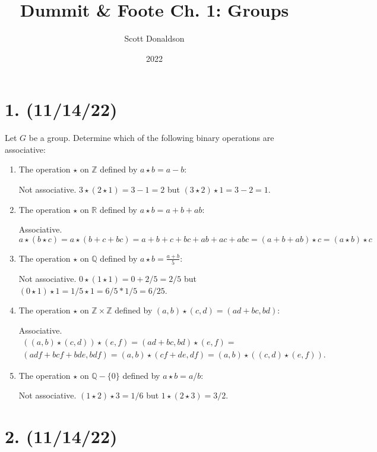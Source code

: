 \documentclass{article}
\title{Dummit \& Foote Ch. 1: Groups}
\author{Scott Donaldson}
\date{2022}
\begin{document}
\maketitle

\section*{1. (11/14/22)}

Let $G$ be a group. Determine which of the following binary operations are associative:

\begin{enumerate}[label=\alph*)]
    \item The operation $\star$ on $\mathbb{Z}$ defined by $a \star b = a - b:$
    
          Not associative. $3 \star (2 \star 1) = 3 - 1 = 2$ but $(3 \star 2) \star 1 = 3 - 2 = 1$.
    \item The operation $\star$ on $\mathbb{R}$ defined by $a \star b = a + b + ab:$
    
          Associative. 
          \begin{equation*}
            a \star (b \star c) = a \star (b + c + bc) = a + b + c + bc + ab + ac + abc =
            (a + b + ab) \star c = (a \star b) \star c
          \end{equation*}
    \item The operation $\star$ on $\mathbb{Q}$ defined by $a \star b = \frac{a + b}{5}$:
    
          Not associative. $0 \star (1 \star 1) = 0 + 2/5 = 2/5$ but $(0 \star 1) \star 1 = 1/5 \star 1 = 6/5 * 1/5 = 6/25$.
    \item The operation $\star$ on $\mathbb{Z} \times \mathbb{Z}$ defined by $(a, b) \star (c, d) = (ad + bc, bd):$
    
          Associative.
          \begin{multline*}
            ((a,b)\star(c,d))\star(e,f) = (ad + bc, bd)\star(e,f) = \\
            (adf + bcf + bde, bdf) = (a,b)\star(cf + de, df) = (a,b)\star((c,d)\star(e,f)).
          \end{multline*}
    \item The operation $\star$ on $\mathbb{Q} - \{0\}$ defined by $a \star b = a / b:$
    
          Not associative. $(1 \star 2) \star 3 = 1/6$ but $1 \star (2 \star 3) = 3/2$.
\end{enumerate}

\section*{2. (11/14/22)}
\end{document}
